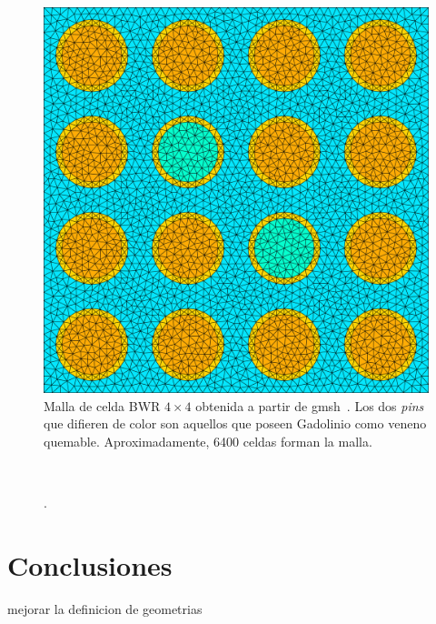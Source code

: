\documentclass[11pt]{article}
\numberwithin{equation}{section}
\begin{document}
\begin{figure}[!h]
 \begin{center}
  \includegraphics[width=0.6\linewidth]{graficos/bwr-gadolinio/bwr-gadolinio.pdf}
 \end{center}
\caption{\label{fig:bwr-mesh} Malla de celda BWR $\num{4} \times \num{4}$ obtenida a partir de gmsh~\cite{gmsh}. Los dos \emph{pins} que difieren de color son aquellos que poseen Gadolinio como veneno quemable. Aproximadamente, \num{6400} celdas forman la malla.}
\end{figure}

\begin{figure}[!h]
 \begin{center}
  \\
  \caption{.}
  \label{fig:bwr-flujos}
 \end{center}
\end{figure}



\section{Conclusiones}

mejorar la definicion de geometrias

\label{lastpage}


\pagebreak
\printbibliography
\end{document}
